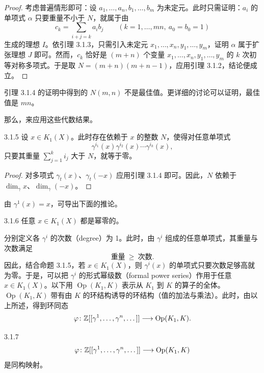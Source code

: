 \begin{proof}
考虑普遍情形即可：设 $a_1,\dots,a_n,b_1,\dots,b_m$ 为未定元。此时只需证明：$a_i$ 的单项式 $\alpha$ 只要重量不小于 $N$，就属于由
\[
c_k=\sum_{i+j=k}a_ib_j\qquad(k=1,\dots,mn,\ a_0=b_0=1)
\]
生成的理想 $I$。依引理 3.1.3，只需引入未定元 $x_1,\dots,x_n,y_1,\dots,y_m$，证明 $\alpha$ 属于扩张理想 $J$ 即可。然而，$c_k$ 恰好是 $(m+n)$ 个变量 $x_1,\dots,x_n,y_1,\dots,y_m$ 的 $k$ 次初等对称多项式。于是取 $N=(m+n)(m+n-1)$，应用引理 3.1.2，结论便成立。
\end{proof}

\begin{remark}{}
引理 3.1.4 的证明中得到的 $N(m,n)$ 不是最佳值。更详细的讨论可以证明，最佳值是 $mn$。
\end{remark}

那么，来应用这些代数结果。

\begin{proposition*}{3.1.5}
设 $x\in K_1(X)$。此时存在依赖于 $x$ 的整数 $N$，使得对任意单项式
\[
\gamma^{i_1}(x)\gamma^{i_2}(x)\cdots\gamma^{i_k}(x),
\]
只要其重量 $\sum_{j=1}^{k}i_j$ 大于 $N$，就等于零。
\end{proposition*}

\begin{proof}
对多项式 $\gamma_t(x)$、$\gamma_t(-x)$ 应用引理 3.1.4 即可。因此，$N$ 依赖于 $\dim_\gamma x$、$\dim_\gamma(-x)$。
\end{proof}

由 $\gamma^1(x)=x$，可导出下面的推论。

\begin{corollary*}{3.1.6}
任意 $x\in K_1(X)$ 都是幂零的。
\end{corollary*}

分别定义各 $\gamma^i$ 的次数（degree）为 1。此时，由 $\gamma^i$ 组成的任意单项式，其重量与次数满足
\[
\text{重量}\ \ge\ \text{次数}.
\]
因此，结合命题 3.1.5，若 $x\in K_1(X)$，则 $\gamma^i(x)$ 的单项式只要次数足够高就为零。于是，可以把 $\gamma^i$ 的形式幂级数（formal power series）作用于任意 $x\in K_1(X)$。以下用 $\operatorname{Op}(K_1,K)$ 表示从 $K_1$ 到 $K$ 的算子的全体。$\operatorname{Op}(K_1,K)$ 带有由 $K$ 的环结构诱导的环结构（值的加法与乘法）。此时，由以上所述，得到环同态
\[
\varphi\colon \mathbb{Z}[[\gamma^1,\dots,\gamma^n,\dots]]\longrightarrow \operatorname{Op}(K_1,K).
\]

\begin{theorem*}{3.1.7}
\[
\varphi\colon \mathbb{Z}[[\gamma^1,\dots,\gamma^n,\dots]]\longrightarrow \operatorname{Op}(K_1,K)
\]
是同构映射。
\end{theorem*}


